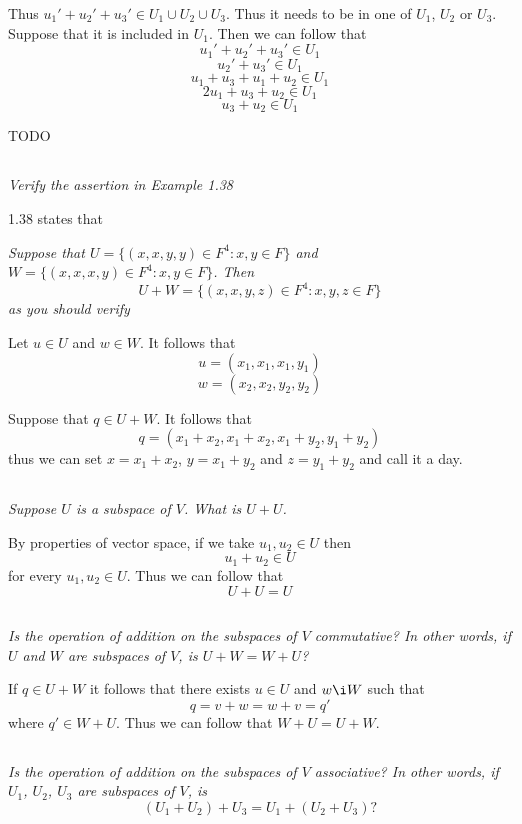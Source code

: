 \documentclass[11pt,oneside,titlepage]{book}
\begin{document}
Thus $u_1' + u_2' + u_3' \in U_1 \cup U_2 \cup U_3$. Thus it needs to
be in one of $U_1$, $U_2$ or $U_3$. Suppose that it is included in
$U_1$. Then we can follow that
$$u_1' + u_2' + u_3' \in U_1$$
$$u_2' + u_3' \in U_1$$
$$u_1 + u_3 + u_1 + u_2 \in U_1$$
$$2u_1 + u_3  + u_2 \in U_1$$
$$u_3  + u_2 \in U_1$$

TODO

\subsection{}
\textit{Verify the assertion in Example 1.38}

1.38 states that

\textit{Suppose that $U = \{(x, x, y, y) \in F^4: x, y \in F\}$ and
  $W = \{(x, x, x, y) \in F^4: x, y \in F\}$. Then }
$$U + W = \{(x, x, y, z) \in F^4: x, y, z \in F\}$$
\textit{as you should verify}

Let $u \in U$ and $w \in W$. It follows that
$$u = (x_1, x_1, x_1, y_1)$$
$$w = (x_2, x_2, y_2, y_2)$$

Suppose that $q \in U + W$.
It follows that
$$q = (x_1 + x_2, x_1 + x_2, x_1 + y_2, y_1 + y_2)$$
thus we can set $x = x_1 + x_2$, $y = x_1 + y_2$ and $z = y_1 + y_2$
and call it a day.

\subsection{}
\textit{Suppose $U$ is a subspace of $V$. What is $U + U$.}

By properties of vector space, if we take $u_1, u_2 \in U$ then
$$u_1 + u_2 \in U$$
for every $u_1, u_2 \in U$. Thus we can follow that
$$U + U = U$$

\subsection{}
\textit{Is the operation of addition on the subspaces of $V$ commutative? In
  other words, if $U$ and $W$ are subspaces of $V$, is $U + W = W + U$?}

If $q \in U + W$ it follows that there exists $u \in U$ and $w \i W$
such that
$$q = v + w = w + v = q'$$
where $q' \in W + U$. Thus we can follow that $W + U = U + W$.

\subsection{}

\textit{Is the operation of addition on the subspaces of $V$ associative? In
  other words, if $U_1$, $U_2$, $U_3$ are subspaces of $V$, is}
$$(U_1 + U_2) + U_3 = U_1 + (U_2 + U_3)?$$
\end{document}
